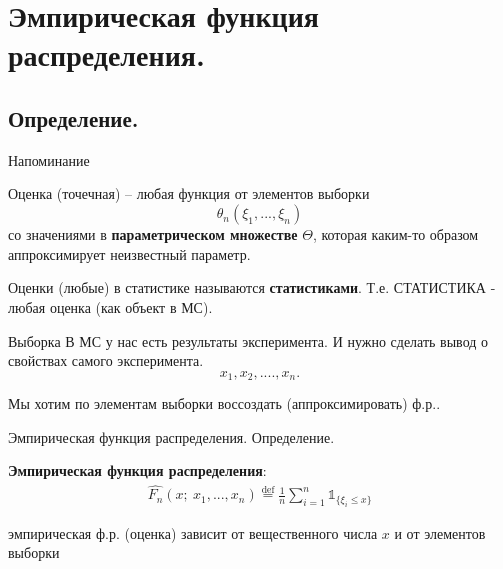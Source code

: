 
\section{}


\section{Эмпирическая функция распределения.}
\subsection{Определение.}


\begin{frame}{Напоминание}
\begin{definition}
   Оценка (точечная) -- любая функция от элементов выборки 
   $$\hat{\theta}_n(\xi_1,..., \xi_n)$$ 
   со значениями в \textbf{параметрическом множестве} $\Theta$, 
которая каким-то образом аппроксимирует неизвестный параметр.

\end{definition}

\begin{definition}
Оценки (любые) в статистике называются \textbf{статистиками}.
Т.е. СТАТИСТИКА - любая оценка (как объект в МС).

\end{definition}



\end{frame}


\begin{frame}{Выборка}
В МС у нас есть результаты эксперимента. И нужно сделать вывод о свойствах самого эксперимента.  
$$
x_1,x_2, ...., x_n.
$$

Мы хотим по элементам выборки воссоздать (аппроксимировать) ф.р..

\end{frame}

\begin{frame}{Эмпирическая функция распределения. Определение.}


\begin{definition}
     \textbf{Эмпирическая функция распределения}:
     \begin{eqnarray}
         \hat{F_n}(x;~x_1,...,x_n) 
         \overset{\mathrm{def}}{=}
         \frac{1}{n}\sum_{i=1}^n
         \mathds{1}_{\{\xi_i \leqslant x \}}
     \end{eqnarray}
\end{definition}

 
эмпирическая ф.р.  (оценка)  зависит от вещественного числа $x$ и от элементов выборки

\end{frame}

